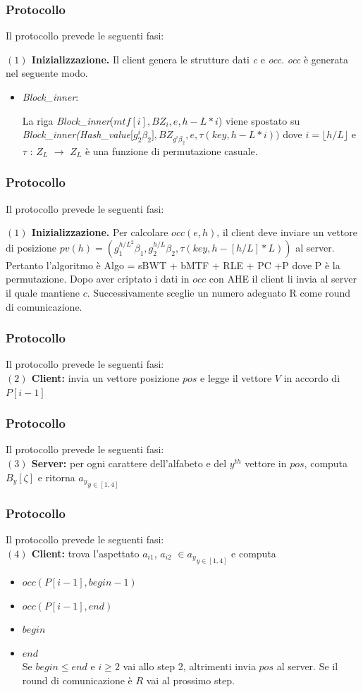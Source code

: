 \documentclass{beamer}
\begin{document}
\begin{frame}
\frametitle{Protocollo}
Il protocollo prevede le seguenti fasi:

\textbf{$(1)$ Inizializzazione.} Il client genera le strutture dati \textit{c} e \textit{occ}. \textit{occ} è generata nel seguente modo.

\begin{itemize}
\item \textit{Block\_inner}:


La riga \textit{Block\_inner}($mtf[i],BZ_{i}, e, h-L*i$) viene spostato su \textit{Block\_inner}\textit{(Hash\_value}[$g^{i}_{2}\beta_{2}], BZ_{g^{i}{\beta_{2}}}, e, \tau(key, h-L*i))$
dove $i = \lfloor h/L\rfloor$ e $\tau$ : $Z_{L} $ $\rightarrow$ $Z_{L} $ è una funzione di permutazione casuale.
\end{itemize}
\end{frame}
\begin{frame}
\frametitle{Protocollo}
Il protocollo prevede le seguenti fasi:

\textbf{$(1)$ Inizializzazione.}
Per calcolare $occ(e, h)$, il client deve inviare un vettore di posizione $pv(h) = (g_{1}^{h/L^{2}} \beta_{1}, g_{2}^{h/L} \beta_{2}, \tau(key, h-[h/L] * L) )$ al server.\\ 

Pertanto l'algoritmo è Algo = sBWT + bMTF + RLE + PC +P dove P è la permutazione. Dopo aver criptato i dati in $occ$ con AHE il client li invia al server il quale mantiene $c$. Successivamente sceglie un numero adeguato R come round di comunicazione.
\end{frame}

\begin{frame}
\frametitle{Protocollo}
Il protocollo prevede le seguenti fasi:\\
\textbf{$(2)$ Client:} invia un vettore posizione $pos$ e legge il vettore $V$ in accordo di $P[i-1]$
\end{frame}

\begin{frame}
\frametitle{Protocollo}
Il protocollo prevede le seguenti fasi:\\
\textbf{$(3)$ Server:} per ogni carattere dell'alfabeto e del $y^{th}$ vettore in $pos$, computa $B_{y}[\zeta]$ e ritorna ${a_{y}}_{y\in[1,4]}$
\end{frame}

\begin{frame}
\frametitle{Protocollo}
Il protocollo prevede le seguenti fasi:\\
\textbf{$(4)$ Client:} trova l'aspettato $a_{i1}$, $a_{i2}$ $\in {a_{y}}_{y\in[1,4]} $ e computa
\begin{itemize}
\item $occ(P[i-1], begin-1)$
\item $occ(P[i-1], end)$
\item $begin$
\item $end$
\\	Se $begin \leq end$ e $i \geq 2 $ vai allo step 2, altrimenti invia $pos$ al server. Se il round di comunicazione è $R$ vai al prossimo step.
\end{itemize}
\end{frame}
\end{document}

